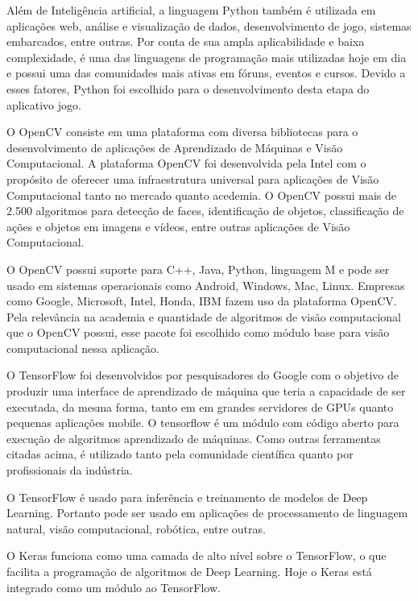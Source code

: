             Além de Inteligência artificial, a linguagem Python também é utilizada em aplicações web, análise e visualização de dados, desenvolvimento de jogo, sistemas embarcados, entre outras. Por conta de sua ampla aplicabilidade e baixa complexidade,  é uma das linguagens de programação mais utilizadas hoje em dia e possui uma das comunidades mais ativas em fóruns, eventos e cursos. Devido a esses fatores, Python foi escolhido para o desenvolvimento desta etapa do aplicativo jogo.  
                
            O OpenCV consiste em uma plataforma com diversa bibliotecas para o desenvolvimento de aplicações de Aprendizado de Máquinas e Visão Computacional. A plataforma OpenCV foi desenvolvida pela Intel com o propósito de oferecer uma infraestrutura universal para aplicações de Visão Computacional tanto no mercado quanto acedemia. O OpenCV possui mais de 2.500 algoritmos para detecção de faces, identificação de objetos, classificação de ações e objetos em imagens e vídeos, entre outras aplicações de Visão Computacional.
            
            O OpenCV possui suporte para C++, Java, Python, linguagem M e pode ser usado em sistemas operacionais como Android, Windows, Mac, Linux. Empresas como Google, Microsoft, Intel, Honda,  IBM fazem uso da plataforma OpenCV. Pela relevância na academia e quantidade de algoritmos de visão computacional que o OpenCV possui, esse pacote foi escolhido como módulo base para visão computacional nessa aplicação.
            
            O TensorFlow foi desenvolvidos por pesquisadores do Google com o objetivo de produzir uma interface de aprendizado de máquina que teria a capacidade de ser executada, da mesma forma, tanto em em grandes servidores de GPUs quanto pequenas aplicações mobile. O tensorflow é um módulo com código aberto para execução de algoritmos aprendizado de máquinas. Como outras ferramentas citadas acima, é utilizado tanto pela comunidade científica quanto por profissionais da indústria.
             
            O TensorFlow é usado para inferência e treinamento de modelos de Deep Learning. Portanto pode ser usado em aplicações de processamento de linguagem natural, visão computacional, robótica, entre outras.
            
            O Keras funciona como uma camada de alto nível sobre o TensorFlow, o que facilita a programação de algoritmos de Deep Learning. Hoje o Keras está integrado como um módulo ao TensorFlow.  
            

